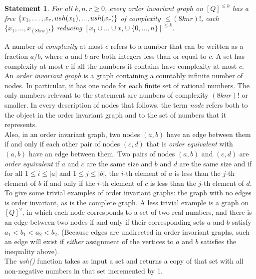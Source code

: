 \documentclass[11pt]{article}
\newtheorem{statement}{Statement}
\begin{document}
\begin{statement} \label{eq:friedman}
For all $k, n, r \ge 0$, every order invariant graph on $[Q]^{\le k}$ has a free $\{x_1,\dots,x_r, \\
ush(x_1),...,ush(x_r)\}$ of complexity $\le (8knr)!$, each $\{x_1, \dots, x_{(8kni)!}\}$
reducing $[x_1 \cup \dots \cup x_i \cup \{0,\dots,n\}]^{\le k}$. \cite{friedman}
\end{statement}

A number of \emph{complexity} at most $c$ refers to a number that can be written as a fraction $a/b$, where $a$ and $b$ are both integers less than or equal to $c$. A set has complexity at most $c$ if all the numbers it contains have complexity at most $c$. \\ 

An \emph{order invariant graph} is a graph containing a countably infinite number of nodes. In particular, it has one node for each finite set of rational numbers. The only numbers relevant to the statement are numbers of complexity $(8knr)!$ or smaller. In every description of nodes that follows, the term \emph{node} refers both to the object in the order invariant graph and to the set of numbers that it represents. \\

Also, in an order invariant graph, two nodes $(a,b)$ have an edge between them if and only if each other pair of nodes $(c,d)$ that is \emph{order equivalent} with $(a,b)$ have an edge between them. Two pairs of nodes $(a, b)$ and $(c, d)$ are \emph{order equivalent} if $a$ and $c$ are the same size and $b$ and $d$ are the same size and if for all $1 \le i \le |a|$ and $1 \le j \le |b|$, the $i$-th element of $a$ is less than the $j$-th element of $b$ if and only if the $i$-th element of $c$ is less than the $j$-th element of $d$. \\

To give some trivial examples of order invariant graphs: the graph with no edges is order invariant, as is the complete graph. A less trivial example is a graph on $[Q]^2$, in which each node corresponds to a set of two real numbers, and there is an edge between two nodes if and only if their corresponding sets $a$ and $b$ satisfy $a_1 < b_1 < a_2 < b_2$. (Because edges are undirected in order invariant graphs, such an edge will exist if \emph{either} assignment of the vertices to $a$ and $b$ satisfies the inequality above). \\

The \emph{ush()} function takes as input a set and returns a copy of that set with all non-negative numbers in that set incremented by 1. \\ 
\end{document}
